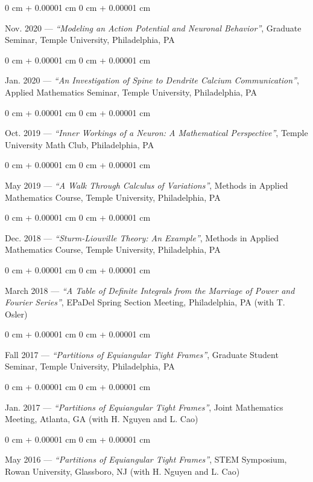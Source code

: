 \documentclass[10pt, letterpaper]{article}
\newenvironment{onecolentry}{
    \begin{adjustwidth}{
        0 cm + 0.00001 cm
    }{
        0 cm + 0.00001 cm
    }
}{
    \end{adjustwidth}
} %
\begin{document}
\begin{onecolentry}
    Nov. 2020 — \textit{“Modeling an Action Potential and Neuronal Behavior”}, Graduate Seminar, Temple University, Philadelphia, PA
\end{onecolentry}

\begin{onecolentry}
    Jan. 2020 — \textit{“An Investigation of Spine to Dendrite Calcium Communication”}, Applied Mathematics Seminar, Temple University, Philadelphia, PA
\end{onecolentry}

\begin{onecolentry}
    Oct. 2019 — \textit{“Inner Workings of a Neuron: A Mathematical Perspective”}, Temple University Math Club, Philadelphia, PA
\end{onecolentry}

\begin{onecolentry}
    May 2019 — \textit{“A Walk Through Calculus of Variations”}, Methods in Applied Mathematics Course, Temple University, Philadelphia, PA
\end{onecolentry}

\begin{onecolentry}
    Dec. 2018 — \textit{“Sturm-Liouville Theory: An Example”}, Methods in Applied Mathematics Course, Temple University, Philadelphia, PA
\end{onecolentry}

\begin{onecolentry}
    March 2018 — \textit{“A Table of Definite Integrals from the Marriage of Power and Fourier Series”}, EPaDel Spring Section Meeting, Philadelphia, PA (with T. Osler)
\end{onecolentry}

\begin{onecolentry}
    Fall 2017 — \textit{“Partitions of Equiangular Tight Frames”}, Graduate Student Seminar, Temple University, Philadelphia, PA
\end{onecolentry}

\begin{onecolentry}
    Jan. 2017 — \textit{“Partitions of Equiangular Tight Frames”}, Joint Mathematics Meeting, Atlanta, GA (with H. Nguyen and L. Cao)
\end{onecolentry}

\begin{onecolentry}
    May 2016 — \textit{“Partitions of Equiangular Tight Frames”}, STEM Symposium, Rowan University, Glassboro, NJ (with H. Nguyen and L. Cao)
\end{onecolentry}
\end{document}
